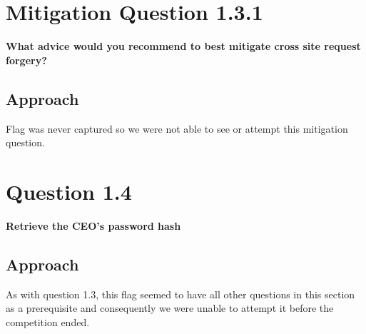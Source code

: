 \section{Mitigation Question 1.3.1}
\textbf{What advice would you recommend to best mitigate cross site request
forgery?}
\subsection{Approach}
Flag was never captured so we were not able to see or attempt this mitigation
question.

\section{Question 1.4}
\textbf{Retrieve the CEO's password hash}
\subsection{Approach}
As with question 1.3, this flag seemed to have all other questions in this
section as a prerequisite and consequently we were unable to attempt it before
the competition ended.
